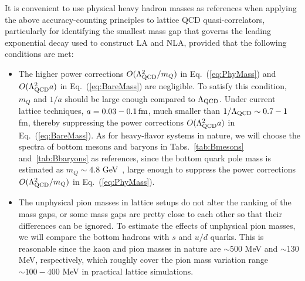 \documentclass[a4paper,11pt]{article}
\begin{document}
It is convenient to use physical heavy hadron masses as references when applying the above accuracy-counting principles to lattice QCD quasi-correlators, particularly for identifying the smallest mass gap that governs the leading exponential decay used to construct LA and NLA, provided that the following conditions are met: 
\begin{itemize}
\item The higher power corrections $O(\Lambda_{\rm QCD}^2/m_Q)$ in Eq.~(\ref{eq:PhyMass}) and $O(\Lambda_{\rm QCD}^2 a)$ in Eq.~(\ref{eq:BareMass}) are negligible. To satisfy this condition, $m_Q$ and $1/a$ should be large enough compared to $\Lambda_{\rm QCD}$. Under current lattice techniques, $a=0.03-0.1 \, {\rm fm}$, much smaller than $1/\Lambda_{\rm QCD} \sim 0.7 - 1$ fm, thereby suppressing the power corrections $O(\Lambda_{\rm QCD}^2 a)$ in Eq.~(\ref{eq:BareMass}). As for heavy-flavor systems in nature, we will choose the spectra of bottom mesons and baryons in Tabs.~\ref{tab:Bmesons} and~\ref{tab:Bbaryons} as references, since the bottom quark pole mass is estimated as $m_Q \sim 4.8$ GeV~\cite{Ayala:2019hkn}, large enough to suppress the power corrections $O(\Lambda_{\rm QCD}^2/m_Q)$ in Eq.~(\ref{eq:PhyMass}). 
\item The unphysical pion masses in lattice setups do not alter the ranking of the mass gaps, or some mass gaps are pretty close to each other so that their differences can be ignored. To estimate the effects of unphysical pion masses, we will compare the bottom hadrons with $s$ and $u/d$ quarks. This is reasonable since the kaon and pion masses in nature are $\sim 500$ MeV and $\sim 130$ MeV, respectively, which roughly cover the pion mass variation range $\sim 100-400$ MeV in practical lattice simulations. 
\end{itemize}
\end{document}

